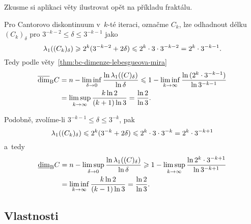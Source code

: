 Zkusme si aplikaci věty ilustrovat opět na příkladu fraktálu.
\begin{example}\label{ex:cantorovo-diskontinuum-potreti}
    Pro Cantorovo diskontinuum v~$k$-té iteraci, označme $C_k$, lze odhadnout délku $(C_k)_\delta$ pro $3^{-k-2}\leqslant\delta\leqslant 3^{-k-1}$ jako
    \[\lambda_1((C_k)_\delta)\geqslant 2^k(3^{-k-2}+2\delta)\leqslant2^k\cdot 3\cdot 3^{-k-2}=2^k\cdot 3^{-k-1}.\]
    Tedy podle věty~\ref{thm:bc-dimenze-lebesgueova-mira}
    \begin{align*}
        \overline{\dim}_\textup{B}{C}&=n-\liminf_{\delta\to 0}\dfrac{\ln{\ensuremath{\lambda_1}((C)_\delta)}}{\ln{\delta}}\leqslant1-\liminf_{k\to\infty}\dfrac{\ln{(2^{k}\cdot 3^{-k-1})}}{\ln{3^{-k-1}}}\\
        &=\limsup_{k\to\infty}\dfrac{k\ln{2}}{(k+1)\ln{3}}=\dfrac{\ln{2}}{\ln{3}}.
    \end{align*}

    Podobně, zvolíme-li $3^{-k-1}\leqslant\delta\leqslant 3^{-k}$, pak
    \[\lambda_1((C_k)_\delta)\leqslant 2^k(3^{-k}+2\delta)\leqslant2^k\cdot 3\cdot 3^{-k}=2^k\cdot 3^{-k+1}\]
    a~tedy
    \begin{align*}
        \underline{\dim}_\textup{B}{C}&=n-\limsup_{\delta\to 0}\dfrac{\ln{\ensuremath{\lambda_1}((C)_\delta)}}{\ln{\delta}}\geqslant 1-\limsup_{k\to\infty}\dfrac{\ln{2^{k}\cdot 3^{-k+1}}}{\ln{3^{-k+1}}}\\
        &=\liminf_{k\to\infty}\dfrac{k\ln{2}}{(k-1)\ln{3}}=\dfrac{\ln{2}}{\ln{3}}.
    \end{align*}
\end{example}

\subsection{Vlastnosti}\label{subsec:vlastnosti-bc-dimenze}

